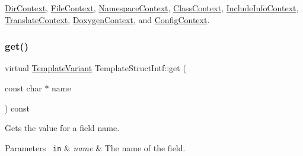 \mbox{\hyperlink{class_dir_context_aed347462a6216f09bf1ca609e1cc9c1a}{Dir\+Context}}, \mbox{\hyperlink{class_file_context_a4de39e9e60907cd5d245997c45e7f29f}{File\+Context}}, \mbox{\hyperlink{class_namespace_context_a796dffc7c1fbe50fc7aeb9c6fd072205}{Namespace\+Context}}, \mbox{\hyperlink{class_class_context_acb15feacf639082eca1d686f54dec3db}{Class\+Context}}, \mbox{\hyperlink{class_include_info_context_a0de1d814488fa964c23ec201832f7ca7}{Include\+Info\+Context}}, \mbox{\hyperlink{class_translate_context_a8c6e3af2496041690177372ac2bf56cf}{Translate\+Context}}, \mbox{\hyperlink{class_doxygen_context_a354b9dc7833167a7028074acf11d0974}{Doxygen\+Context}}, and \mbox{\hyperlink{class_config_context_a6e870043f96de613f7f00e10aa57359e}{Config\+Context}}.

\mbox{\label{class_template_struct_intf_a3d610cb81b4adbb531ebed3aa3d09b51}} 
\subsubsection{\texorpdfstring{get()}{get()}}
{\footnotesize\ttfamily virtual \mbox{\hyperlink{class_template_variant}{Template\+Variant}} Template\+Struct\+Intf\+::get (\begin{DoxyParamCaption}\item[{const char $\ast$}]{name }\end{DoxyParamCaption}) const\hspace{0.3cm}{\ttfamily [pure virtual]}}

Gets the value for a field name. 
\begin{DoxyParams}[1]{Parameters}
\mbox{\texttt{ in}}  & {\em name} & The name of the field. \\
\hline
\end{DoxyParams}


